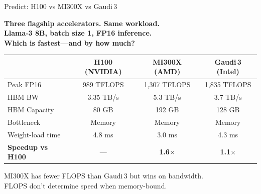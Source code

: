 \documentclass[aspectratio=169, 12pt]{beamer}
\begin{document}
\begin{frame}{Predict: H100 vs MI300X vs Gaudi\,3}

\centering
\Large\bfseries
Three flagship accelerators. Same workload.\\[0.3cm]
\normalsize
Llama-3 8B, batch size 1, FP16 inference.\\
Which is fastest---and by how much?\\[0.3cm]

\pause

\scriptsize
\begin{tabular}{lccc}
\toprule
              & \textbf{H100 (NVIDIA)} & \textbf{MI300X (AMD)} & \textbf{Gaudi\,3 (Intel)} \\
\midrule
Peak FP16     & 989 TFLOPS    & 1,307 TFLOPS  & 1,835 TFLOPS \\
HBM BW        & 3.35 TB/s     & 5.3 TB/s      & 3.7 TB/s \\
HBM Capacity  & 80 GB         & 192 GB        & 128 GB \\
\midrule
Bottleneck    & Memory        & Memory        & Memory \\
Weight-load time & 4.8 ms     & 3.0 ms        & 4.3 ms \\
\textbf{Speedup vs H100} & ---  & \textbf{1.6$\times$} & \textbf{1.1$\times$} \\
\bottomrule
\end{tabular}

\vspace{0.3cm}
\pause
\small
\alert{MI300X has fewer FLOPS than Gaudi\,3 but wins on bandwidth.\\
FLOPS don't determine speed when memory-bound.}
\end{frame}
\end{document}
